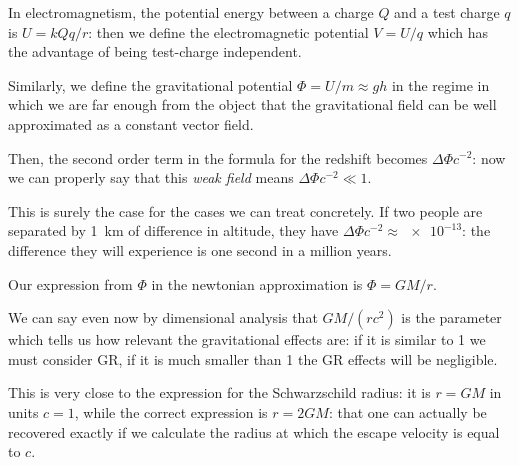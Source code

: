 \documentclass[main.tex]{subfiles}
\begin{document}
In electromagnetism, the potential energy between a charge \(Q\) and a test charge \(q\) is \(U = k Qq/r\): then we define the electromagnetic potential \(V = U/q\) which has the advantage of being test-charge independent.

Similarly, we define the gravitational potential \(\Phi = U/m \approx gh\) in the regime in which we are far enough from the object that the gravitational field can be well approximated as a constant vector field.

Then, the second order term in the formula for the redshift becomes \(\Delta \Phi c^{-2}\): now we can properly say that this \emph{weak field} means \(\Delta \Phi c^{-2} \ll 1\).

This is surely the case for the cases we can treat concretely.
If two people are separated by \SI{1}{km} of difference in altitude, they have \(\Delta \Phi c^{-2} \approx \num{e-13} \): the difference they will experience is one second in a million years.

Our expression from \(\Phi \) in the newtonian approximation is \(\Phi = GM /r\).

We can say even now by dimensional analysis that \(GM / (rc^2)\) is the parameter which tells us how relevant the gravitational effects are: if it is similar to 1 we must consider GR, if it is much smaller than 1 the GR effects will be negligible.

This is very close to the expression for the Schwarzschild radius: it is \(r=GM\) in units \(c=1\), while the correct expression is \(r= 2GM\): that one can actually be recovered exactly if we calculate the radius at which the escape velocity is equal to \(c\).
\end{document}
